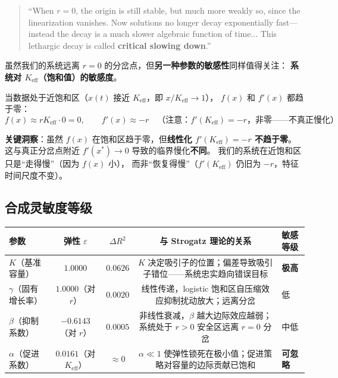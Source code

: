 \documentclass[12pt,a4paper]{article}
\begin{document}
\begin{quote}
\small
``When $r = 0$, the origin is still stable, but much more weakly so, since the linearization
vanishes. Now solutions no longer decay exponentially fast—instead the decay is a much slower
algebraic function of time... This lethargic decay is called \textbf{critical slowing down}.''
\end{quote}

虽然我们的系统远离 $r = 0$ 的分岔点，但\textbf{另一种参数的敏感性}同样值得关注：
\textbf{系统对 $K_{\text{eff}}$（饱和值）的敏感度}。

当数据处于近饱和区（$x(t)$ 接近 $K_{\text{eff}}$，即 $x/K_{\text{eff}} \to 1$），
$f(x)$ 和 $f'(x)$ 都趋于零：
\begin{equation}
f(x) \approx r K_{\text{eff}} \cdot 0 = 0, \qquad
f'(x) \approx -r \quad \text{（注意：$f'(K_{\text{eff}}) = -r$，非零——不真正慢化）}
\end{equation}

\textbf{关键洞察}：虽然 $f(x)$ 在饱和区趋于零，但\textbf{线性化 $f'(K_{\text{eff}}) = -r$ 不趋于零}。
这与真正分岔点附近 $f'(x^*) \to 0$ 导致的临界慢化\textbf{不同}。
我们的系统在近饱和区只是``走得慢''（因为 $f(x)$ 小），
而非``恢复得慢''（$f'(K_{\text{eff}})$ 仍旧为 $-r$，特征时间尺度不变）。

\subsection{合成灵敏度等级}

\begin{center}
\begin{tabular}{lcccl}
\toprule
\textbf{参数} & \textbf{弹性 $\varepsilon$} & \textbf{$\Delta R^2$} &
\textbf{与 Strogatz 理论的关系} & \textbf{敏感等级} \\
\midrule
$K$（基准容量） & $1.0000$ & $0.0626$ &
$K$ 决定吸引子的位置；偏差导致吸引子错位——系统忠实趋向错误目标 &
\textbf{极高} \\[8pt]

$\gamma$（固有增长率） & $1.0000$（对 $r$） & $0.0020$ &
线性传递，logistic 饱和区自压缩效应抑制扰动放大；远离分岔 &
低 \\[8pt]

$\beta$（抑制系数） & $-0.6143$（对 $r$） & $0.0005$ &
非线性衰减，$\beta$ 越大边际效应越弱；系统处于 $r>0$ 安全区远离 $r=0$ 分岔 &
中低 \\[8pt]

$\alpha$（促进系数） & $0.0161$（对 $K_{\text{eff}}$） & $\approx 0$ &
$\alpha \ll 1$ 使弹性锁死在极小值；促进策略对容量的边际贡献已饱和 &
\textbf{可忽略} \\
\bottomrule
\end{tabular}
\end{center}
\end{document}
